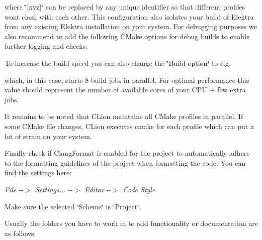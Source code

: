 where \char`\"{}\mbox{[}xyz\mbox{]}\char`\"{} can be replaced by any unique identifier so that different profiles won\textquotesingle{}t clash with each other. This configuration also isolates your build of Elektra from any existing Elektra installation on your system. For debugging purposes we also recommend to add the following C\+Make options for debug builds to enable further logging and checks\+:


\begin{DoxyCode}{0}
\end{DoxyCode}


To increase the build speed you can also change the \char`\"{}\+Build option\char`\"{} to e.\+g.


\begin{DoxyCode}{0}
\end{DoxyCode}


which, in this case, starts 8 build jobs in parallel. For optimal performance this value should represent the number of available cores of your C\+PU + few extra jobs.

It remains to be noted that C\+Lion maintains all C\+Make profiles in parallel. If some C\+Make file changes, C\+Lion executes {\ttfamily cmake} for each profile which can put a lot of strain on your system.

Finally check if {\ttfamily Clang\+Format} is enabled for the project to automatically adhere to the formatting guidelines of the project when formatting the code. You can find the settings here\+:

{\itshape File} -\/-\/$>$ {\itshape Settings...} -\/-\/$>$ {\itshape Editor} -\/-\/$>$ {\itshape Code Style}

Make sure the selected \char`\"{}\+Scheme\char`\"{} is \char`\"{}\+Project\char`\"{}.

Usually the folders you have to work in to add functionality or documentation are as follows\+:


